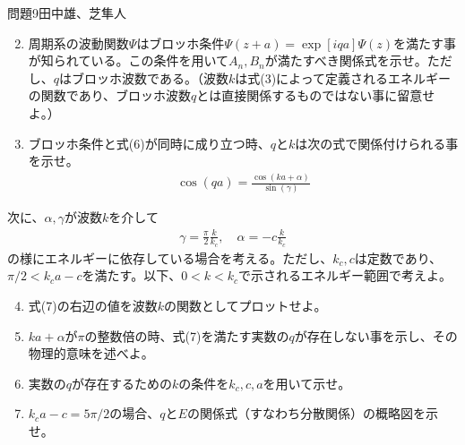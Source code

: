\documentclass[fleqn]{jbook}
\begin{document}
\begin{question}{問題9}{田中雄、芝隼人}
\begin{enumerate}\setcounter{enumi}{1}
\item
周期系の波動関数$\Psi$はブロッホ条件$\Psi (z+a) = \exp [iqa] \Psi (z)$を満たす事が知られている。この条件を用いて$A_n, B_n$が満たすべき関係式を示せ。ただし、$q$はブロッホ波数である。（波数$k$は式(3)によって定義されるエネルギーの関数であり、ブロッホ波数$q$とは直接関係するものではない事に留意せよ。）
\item
ブロッホ条件と式(6)が同時に成り立つ時、$q$と$k$は次の式で関係付けられる事を示せ。
\begin{eqnarray}
\cos (qa) = \frac{ \cos (ka+\alpha )}{\sin (\gamma )}
\end{eqnarray}
\end{enumerate}
次に、$\alpha ,\gamma$が波数$k$を介して
\begin{eqnarray}
\gamma =\frac{\pi}{2} \frac{k}{k_c},\quad \alpha = -c\frac{k}{k_c}
\end{eqnarray}
の様にエネルギーに依存している場合を考える。ただし、$k_c, c$は定数であり、$\pi/2 <k_c a-c$を満たす。以下、$0<k<k_c$で示されるエネルギー範囲で考えよ。
\begin{enumerate}\setcounter{enumi}{3}
\item
式(7)の右辺の値を波数$k$の関数としてプロットせよ。
\item
$ka +\alpha$が$\pi$の整数倍の時、式(7)を満たす実数の$q$が存在しない事を示し、その物理的意味を述べよ。
\item 
実数の$q$が存在するための$k$の条件を$k_c,c,a$を用いて示せ。
\item 
$k_c a-c=5\pi /2$の場合、$q$と$E$の関係式（すなわち分散関係）の概略図を示せ。


\end{enumerate}
\end{question}
\end{document}
